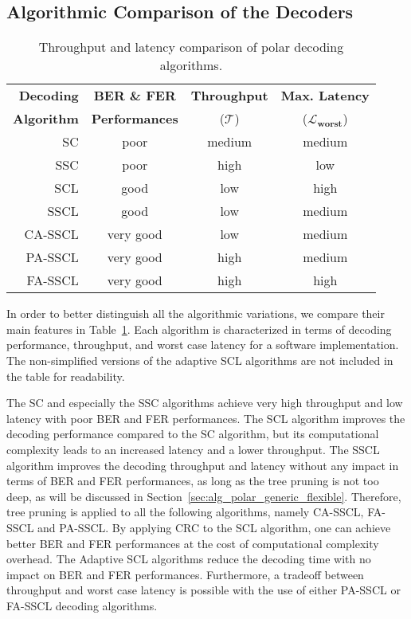 \subsection{Algorithmic Comparison of the Decoders}

\begin{table}[htp]
  \centering
  \caption{Throughput and latency comparison of polar decoding algorithms.}
  \label{tab:alg_polar_algos}
   \begin{tabular}{r c c c}
    \textbf{Decoding}  & \textbf{BER \& FER}   & \multirow{1}{*}{\textbf{Throughput}} & \textbf{Max. Latency}        \\
    \textbf{Algorithm} & \textbf{Performances} & ($\bm{\mathcal{T}}$)                 & ($\bm{\mathcal{L}_{worst}}$) \\
    \hline
    \hline
    SC      & poor      & medium & medium \\
    SSC     & poor      & high   & low    \\
    SCL     & good      & low    & high   \\
    SSCL    & good      & low    & medium \\
    CA-SSCL & very good & low    & medium \\
    PA-SSCL & very good & high   & medium \\
    FA-SSCL & very good & high   & high   \\
  \end{tabular}
\end{table}

In order to better distinguish all the algorithmic variations, we compare their
main features in Table~\ref{tab:alg_polar_algos}. Each algorithm is
characterized in terms of decoding performance, throughput, and worst case
latency for a software implementation. The non-simplified versions of the
adaptive SCL algorithms are not included in the table for readability.

The SC and especially the SSC algorithms achieve very high throughput and low
latency with poor BER and FER performances. The SCL algorithm improves the
decoding performance compared to the SC algorithm, but its computational
complexity leads to an increased latency and a lower throughput. The SSCL
algorithm improves the decoding throughput and latency without any impact in
terms of BER and FER performances, as long as the tree pruning is not too deep,
as will be discussed in Section~\ref{sec:alg_polar_generic_flexible}. Therefore,
tree pruning is applied to all the following algorithms, namely CA-SSCL, FA-SSCL
and PA-SSCL. By applying CRC to the SCL algorithm, one can achieve better BER
and FER performances at the cost of computational complexity overhead. The
Adaptive SCL algorithms reduce the decoding time with no impact on BER and FER
performances. Furthermore, a tradeoff between throughput and worst case latency
is possible with the use of either PA-SSCL or FA-SSCL decoding algorithms.

